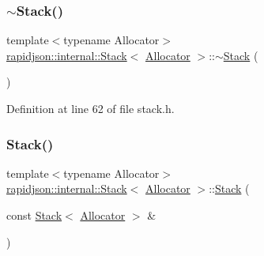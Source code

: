 \subsubsection{\texorpdfstring{$\sim$Stack()}{~Stack()}}
{\footnotesize\ttfamily template$<$typename Allocator$>$ \\
\mbox{\hyperlink{classrapidjson_1_1internal_1_1_stack}{rapidjson\+::internal\+::\+Stack}}$<$ \mbox{\hyperlink{classrapidjson_1_1_allocator}{Allocator}} $>$\+::$\sim$\mbox{\hyperlink{classrapidjson_1_1internal_1_1_stack}{Stack}} (\begin{DoxyParamCaption}{ }\end{DoxyParamCaption})}



Definition at line 62 of file stack.\+h.


\begin{DoxyCode}{0}

\end{DoxyCode}
\mbox{\label{classrapidjson_1_1internal_1_1_stack_a847c6fa5e362beeaa3b12e0bcbcb32ca}} 
\subsubsection{\texorpdfstring{Stack()}{Stack()}\hspace{0.1cm}{\footnotesize\ttfamily [2/2]}}
{\footnotesize\ttfamily template$<$typename Allocator$>$ \\
\mbox{\hyperlink{classrapidjson_1_1internal_1_1_stack}{rapidjson\+::internal\+::\+Stack}}$<$ \mbox{\hyperlink{classrapidjson_1_1_allocator}{Allocator}} $>$\+::\mbox{\hyperlink{classrapidjson_1_1internal_1_1_stack}{Stack}} (\begin{DoxyParamCaption}\item[{const \mbox{\hyperlink{classrapidjson_1_1internal_1_1_stack}{Stack}}$<$ \mbox{\hyperlink{classrapidjson_1_1_allocator}{Allocator}} $>$ \&}]{ }\end{DoxyParamCaption})\hspace{0.3cm}{\ttfamily [private]}}



